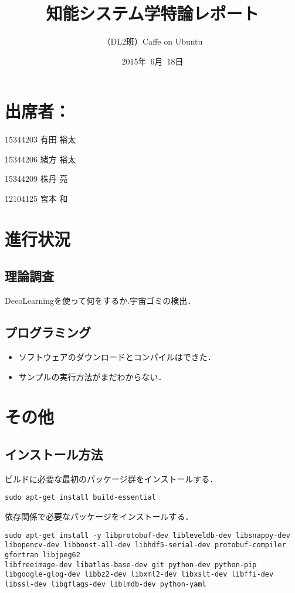 \documentclass[a4paper,10pt]{jsarticle}
\title{知能システム学特論レポート}
\author{
（DL2班）Caffe on Ubuntu\\
}
\date{2015年\ 6月\ 18日}
\begin{document}
\maketitle
\section{出席者：}
\begin{list}%
 {} %
 {} %
 \item 15344203 有田 裕太
 \item 15344206 緒方 裕太
 \item 15344209 株丹 亮
 \item 12104125 宮本 和
\end{list}
\section{進行状況}
\subsection{理論調査}
DeeoLearningを使って何をするか.宇宙ゴミの検出．

\subsection{プログラミング}
\begin{itemize}
 \item ソフトウェアのダウンロードとコンパイルはできた．
 \item サンプルの実行方法がまだわからない．
\end{itemize}

\section{その他}
\subsection{インストール方法}

ビルドに必要な最初のパッケージ群をインストールする．
\begin{lstlisting}[basicstyle=\ttfamily\footnotesize, frame=single]
sudo apt-get install build-essential
\end{lstlisting}

依存関係で必要なパッケージをインストールする．
\begin{lstlisting}[basicstyle=\ttfamily\footnotesize, frame=single]
sudo apt-get install -y libprotobuf-dev libleveldb-dev libsnappy-dev
libopencv-dev libboost-all-dev libhdf5-serial-dev protobuf-compiler gfortran libjpeg62
libfreeimage-dev libatlas-base-dev git python-dev python-pip
libgoogle-glog-dev libbz2-dev libxml2-dev libxslt-dev libffi-dev
libssl-dev libgflags-dev liblmdb-dev python-yaml
\end{lstlisting}
\end{document}
